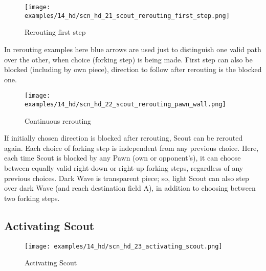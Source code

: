 \vspace*{0.9\baselineskip}
\noindent
\begin{wrapfigure}[9]{l}{0.41\textwidth}
\centering
\texttt{[image: examples/14\_hd/scn\_hd\_21\_scout\_rerouting\_first\_step.png]}
\vspace*{-0.5\baselineskip}
\caption{Rerouting first step}
\label{fig:scn_hd_21_scout_rerouting_first_step}
\end{wrapfigure}
\indent
In rerouting examples here blue arrows are used just to distinguish one valid
path over the other, when choice (forking step) is being made.\newline
\indent
First step can also be blocked (including by own piece), direction to follow
after rerouting is the blocked one.

\vspace*{-0.7\baselineskip}
\noindent
\begin{wrapfigure}[10]{l}{0.41\textwidth} %
\centering
\texttt{[image: examples/14\_hd/scn\_hd\_22\_scout\_rerouting\_pawn\_wall.png]}
\vspace*{-0.5\baselineskip}
\caption{Continuous rerouting}
\label{fig:scn_hd_22_scout_rerouting_pawn_wall}
\end{wrapfigure}
\indent
If initially chosen direction is blocked after rerouting, Scout can be rerouted
again. Each choice of forking step is independent from any previous choice.\newline
\indent
Here, each time Scout is blocked by any Pawn (own or opponent's), it can choose
between equally valid right-down or right-up forking steps, regardless of any
previous choices.
Dark Wave is transparent piece; so, light Scout can also step over dark Wave (and
reach destination field A), in addition to choosing between two forking steps.

\clearpage %

\subsection*{Activating Scout}
\label{sec:Hemera's Dawn/Scout/Activating Scout}

\vspace*{-1.3\baselineskip}
\noindent
\begin{figure}[!h]
\texttt{[image: examples/14\_hd/scn\_hd\_23\_activating\_scout.png]}
\vspace*{-1.3\baselineskip}
\caption{Activating Scout}
\label{fig:scn_hd_23_activating_scout}
\end{figure}


